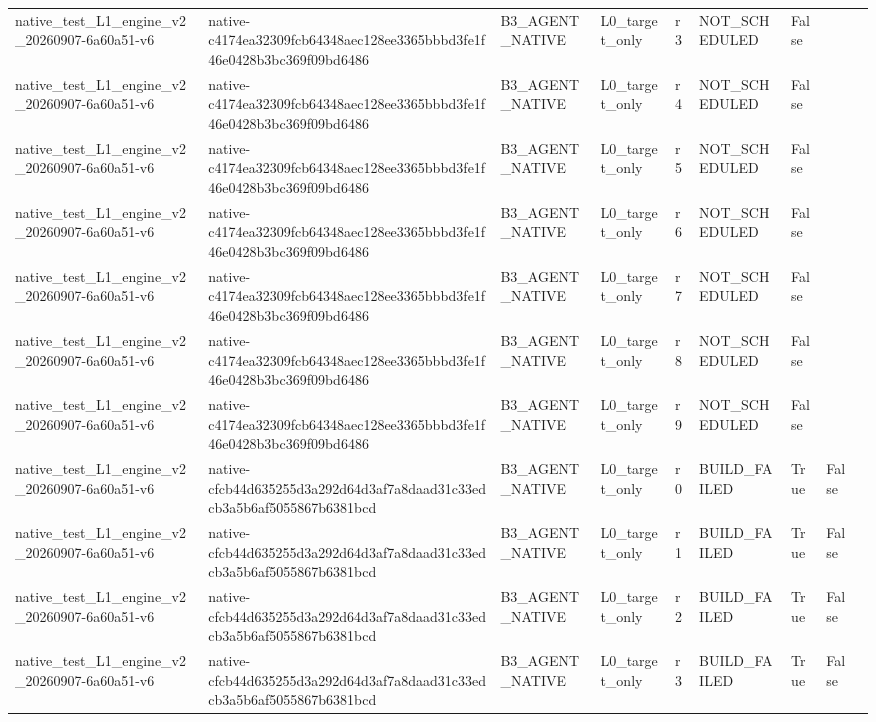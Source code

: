 \begin{tabular}{lllllllll}
native\_test\_L1\_engine\_v2\_20260907-6a60a51-v6 & native-c4174ea32309fcb64348aec128ee3365bbbd3fe1f46e0428b3bc369f09bd6486 & B3\_AGENT\_NATIVE & L0\_target\_only & r3 & NOT\_SCHEDULED & False &  &  \\
native\_test\_L1\_engine\_v2\_20260907-6a60a51-v6 & native-c4174ea32309fcb64348aec128ee3365bbbd3fe1f46e0428b3bc369f09bd6486 & B3\_AGENT\_NATIVE & L0\_target\_only & r4 & NOT\_SCHEDULED & False &  &  \\
native\_test\_L1\_engine\_v2\_20260907-6a60a51-v6 & native-c4174ea32309fcb64348aec128ee3365bbbd3fe1f46e0428b3bc369f09bd6486 & B3\_AGENT\_NATIVE & L0\_target\_only & r5 & NOT\_SCHEDULED & False &  &  \\
native\_test\_L1\_engine\_v2\_20260907-6a60a51-v6 & native-c4174ea32309fcb64348aec128ee3365bbbd3fe1f46e0428b3bc369f09bd6486 & B3\_AGENT\_NATIVE & L0\_target\_only & r6 & NOT\_SCHEDULED & False &  &  \\
native\_test\_L1\_engine\_v2\_20260907-6a60a51-v6 & native-c4174ea32309fcb64348aec128ee3365bbbd3fe1f46e0428b3bc369f09bd6486 & B3\_AGENT\_NATIVE & L0\_target\_only & r7 & NOT\_SCHEDULED & False &  &  \\
native\_test\_L1\_engine\_v2\_20260907-6a60a51-v6 & native-c4174ea32309fcb64348aec128ee3365bbbd3fe1f46e0428b3bc369f09bd6486 & B3\_AGENT\_NATIVE & L0\_target\_only & r8 & NOT\_SCHEDULED & False &  &  \\
native\_test\_L1\_engine\_v2\_20260907-6a60a51-v6 & native-c4174ea32309fcb64348aec128ee3365bbbd3fe1f46e0428b3bc369f09bd6486 & B3\_AGENT\_NATIVE & L0\_target\_only & r9 & NOT\_SCHEDULED & False &  &  \\
native\_test\_L1\_engine\_v2\_20260907-6a60a51-v6 & native-cfcb44d635255d3a292d64d3af7a8daad31c33edcb3a5b6af5055867b6381bcd & B3\_AGENT\_NATIVE & L0\_target\_only & r0 & BUILD\_FAILED & True & False &  \\
native\_test\_L1\_engine\_v2\_20260907-6a60a51-v6 & native-cfcb44d635255d3a292d64d3af7a8daad31c33edcb3a5b6af5055867b6381bcd & B3\_AGENT\_NATIVE & L0\_target\_only & r1 & BUILD\_FAILED & True & False &  \\
native\_test\_L1\_engine\_v2\_20260907-6a60a51-v6 & native-cfcb44d635255d3a292d64d3af7a8daad31c33edcb3a5b6af5055867b6381bcd & B3\_AGENT\_NATIVE & L0\_target\_only & r2 & BUILD\_FAILED & True & False &  \\
native\_test\_L1\_engine\_v2\_20260907-6a60a51-v6 & native-cfcb44d635255d3a292d64d3af7a8daad31c33edcb3a5b6af5055867b6381bcd & B3\_AGENT\_NATIVE & L0\_target\_only & r3 & BUILD\_FAILED & True & False &  \\

\end{tabular}
